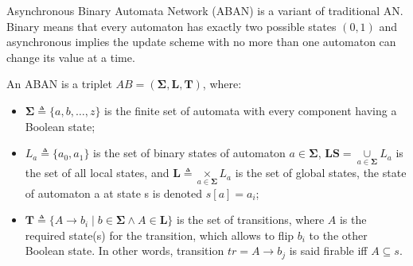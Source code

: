 \documentclass[runningheads]{llncs}
\newcommand{\acm}[3]{#1\rightarrow#2}
\begin{document}
%

Asynchronous Binary Automata Network (ABAN) is a variant of traditional AN. Binary means that every automaton has exactly two possible states $(0,1)$ and asynchronous implies the update scheme with no more than one automaton can change its value at a time. 

\begin{definition}[ABAN]
An ABAN is a triplet $AB = (\mathbf{\Sigma},\mathbf{L},\mathbf{T})$, where:
\begin{itemize}
\item $\mathbf{\Sigma}\triangleq\{a,b,\ldots,z\}$ is the finite set of automata with every component having a Boolean state;
\item $L_a\triangleq\{a_0,a_1\}$ is the set of binary states of automaton $a\in \mathbf{\Sigma}$, $\mathbf{LS}=\underset{a\in \mathbf{\Sigma}}{\cup} L_a$ is the set of all local states, and $\mathbf{L}\triangleq \underset{a\in \mathbf{\Sigma}}{\times} L_a$ is the set of global states, the state of automaton a at state s is denoted $s[a]=a_i$;
\item $\mathbf{T}\triangleq \{A\rightarrow b_i\mid b\in \mathbf{\Sigma} \land A\in \mathbf{L}\}$ is the set of transitions, where $A$ is the required state(s) for the transition, which allows to flip $b_i$ to the other Boolean state. In other words, transition $tr=\acm{A}{b_j}{b_k}$ is said firable iff $A\subseteq s$.%
\end{itemize}
\end{definition}
\end{document}
